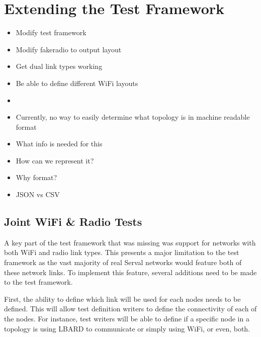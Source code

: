 
\chapter{Extending the Test Framework} %
\label{Chapter4}


\begin{itemize}
    \item Modify test framework
    \item Modify fakeradio to output layout
    \item Get dual link types working
    \item Be able to define different WiFi layouts
    \item 
\end{itemize}


\begin{itemize}
    \item Currently, no way to easily determine what topology is in machine readable format
    \item What info is needed for this 
    \item How can we represent it?
    \item Why format?
    \item JSON vs CSV
\end{itemize}


\section{Joint WiFi \& Radio Tests}
A key part of the test framework that was missing was support for networks with both WiFi and radio link types. 
This presents a major limitation  to the test framework as the vast majority of real Serval networks would feature both of these network links.
To implement this feature, several additions need to be made to the test framework.

First, the ability to define which link will be used for each nodes needs to be defined.
This will allow test definition writers to define the connectivity of each of the nodes. 
For instance, test writers will be able to define if a specific node in a topology is using LBARD to communicate or simply using WiFi, or even, both. 

